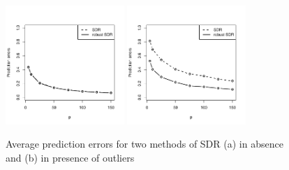 \begin{figure}[t]
\begin{center}
\includegraphics[width=0.4\textwidth]{SDRcomparison_noout}
\includegraphics[width=0.4\textwidth]{SDRcomparison_out}
\caption{Average prediction errors for two methods of SDR (a) in absence and (b) in presence of outliers}
\label{fig:SDRfig}
\end{center}
\end{figure}


